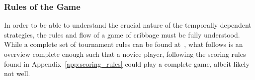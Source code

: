 
\subsubsection{Rules of the Game}

In order to be able to understand the crucial nature of the temporally dependent
strategies, the rules and flow of a game of cribbage must be fully understood.
%
While a complete set of tournament rules can be found at~\cite{ACC_rules},
what follows is an overview complete enough such that a novice player,
following the scoring rules found in Appendix~\ref{app:scoring_rules}
could play a complete game, albeit likely not well.

